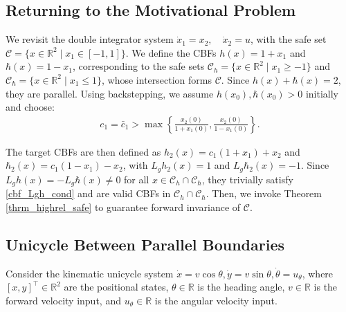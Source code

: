\documentclass[letterpaper, 10 pt, conference]{ieeeconf}
\begin{document}
\subsection{Returning to the Motivational Problem}

We revisit the double integrator system $\dot{x}_1 = x_2, \quad \dot{x}_2 = u$, with the safe set $\mathcal{C} = \{x \in \mathbb{R}^2 \mid x_1 \in [-1,1]\}$. We define the CBFs $h(x) = 1 + x_1$ and $\hbar(x) = 1 - x_1$, corresponding to the safe sets $\mathcal{C}_h = \{x \in \mathbb{R}^2 \mid x_1 \geq -1\}$ and $\mathcal{C}_\hbar = \{x \in \mathbb{R}^2 \mid x_1 \leq 1\}$, whose intersection forms $\mathcal{C}$. Since $h(x) + \hbar(x) = 2$, they are parallel. Using backstepping, we assume $h(x_0), \hbar(x_0) > 0$ initially and choose:
\begin{align}
    c_1 = \bar{c}_1 > \max\left\{\frac{x_2(0)}{1 + x_1(0)}, \frac{x_2(0)}{1 - x_1(0)}\right\}.
\end{align}

The target CBFs are then defined as $ h_2(x) = c_1(1 + x_1) + x_2 $ and $ \hbar_2(x) = c_1(1 - x_1) - x_2 $, with $ L_g h_2(x) = 1 $ and $ L_g \hbar_2(x) = -1 $. Since $ L_g h(x) = -L_g \hbar(x) \neq 0 $ for all $ x \in \mathcal{C}_h\cap\mathcal{C}_\hbar $, they trivially satisfy \eqref{cbf_Lgh_cond} and are valid CBFs in $ \mathcal{C}_h\cap\mathcal{C}_\hbar $. Then, we invoke Theorem \ref{thrm_highrel_safe} to guarantee forward invariance of $ \mathcal{C} $.

\subsection{Unicycle Between Parallel Boundaries}

Consider the kinematic unicycle system $\dot{x} = v \cos\theta, \dot{y} = v \sin\theta, \dot{\theta} = u_\theta$, where $[x,y]^\top \in \mathbb{R}^2$ are the positional states, $\theta \in \mathbb{R}$ is the heading angle, $v \in \mathbb{R}$ is the forward velocity input, and $u_\theta \in \mathbb{R}$ is the angular velocity input.
\end{document}
